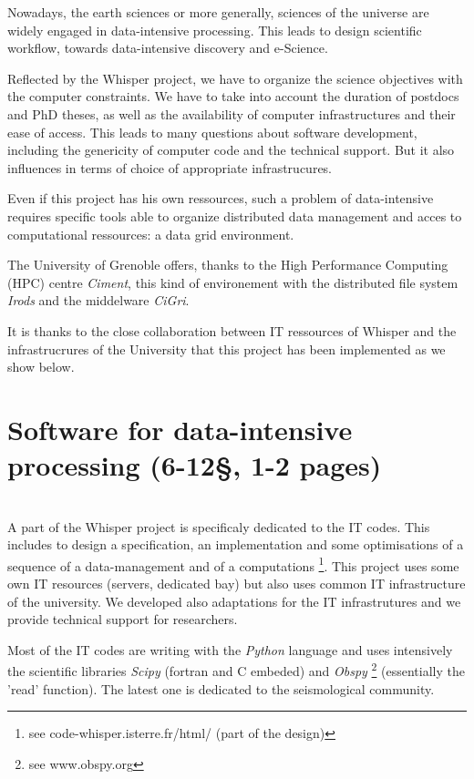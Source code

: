 \documentclass[a4paper, 10pt]{article}
\begin{document}
\begin{multicols}{2}
Nowadays, the earth sciences or more generally, sciences of the universe are widely engaged in
data-intensive processing. This leads to design scientific workflow, towards data-intensive discovery and e-Science.


Reflected by the Whisper project, we have to organize the science objectives with
the computer constraints. We have to take into account 
the duration of postdocs and PhD theses, as well as the availability of computer infrastructures and their ease of access. 
This leads to many questions about software development, including the genericity of computer code and 
the technical support. But it also influences in terms of choice of appropriate infrastrucures.

Even if this project has his own ressources, such a problem of data-intensive requires specific tools able to 
organize distributed data management and acces to computational ressources: a data grid environment.

The University of Grenoble offers, thanks to the High Performance Computing (HPC) centre \emph{Ciment}, this kind of environement with the distributed file system \emph{Irods}
and the middelware \emph{CiGri}.%


It is thanks to the close collaboration between IT ressources of Whisper and the infrastrucrures of the University
that this project has been implemented as we show below.


\newpage

\section{Software for data-intensive processing (6-12\S , 1-2 pages) }
~\\

A part of the Whisper project is specificaly dedicated to the IT codes. This includes to design a specification, an implementation and some optimisations of
a sequence of a data-management and of a computations \footnote{see code-whisper.isterre.fr/html/ (part of the design)}.
This project uses some own IT resources (servers, dedicated bay) but also uses common IT infrastructure of the university.
We developed also adaptations for the IT infrastrutures and we provide technical support for researchers.

Most of the IT codes are writing with the \emph{Python} language and uses intensively the scientific libraries \emph{Scipy} (fortran and C embeded) 
and \emph{Obspy} \footnote{ see www.obspy.org} (essentially the 'read' function). The latest one is dedicated to the seismological community. 


\end{multicols}
\end{document}

